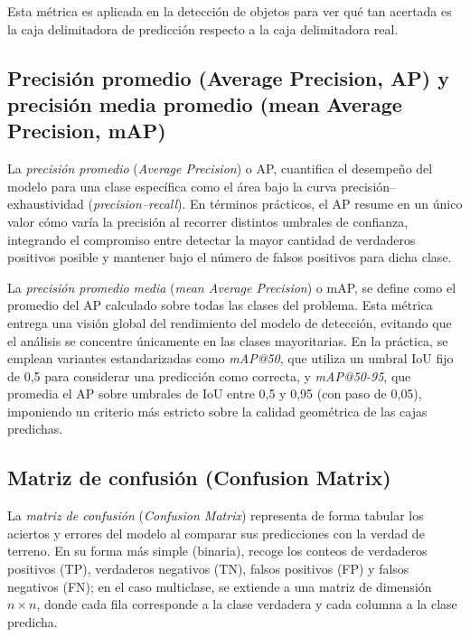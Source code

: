 \par Esta métrica es aplicada en la detección de objetos para ver qué tan acertada es la caja delimitadora de predicción respecto a la caja delimitadora real.

\subsection{Precisión promedio (Average Precision, AP) y precisión media promedio (mean Average Precision, mAP)}

\par La \textit{precisión promedio} (\textit{Average Precision}) o AP, cuantifica el desempeño del modelo para una clase específica como el área bajo la curva precisión--exhaustividad (\textit{precision--recall}). En términos prácticos, el AP resume en un único valor cómo varía la precisión al recorrer distintos umbrales de confianza, integrando el compromiso entre detectar la mayor cantidad de verdaderos positivos posible y mantener bajo el número de falsos positivos para dicha clase. \\

\par La \textit{precisión promedio media} (\textit{mean Average Precision}) o mAP, se define como el promedio del AP calculado sobre todas las clases del problema. Esta métrica entrega una visión global del rendimiento del modelo de detección, evitando que el análisis se concentre únicamente en las clases mayoritarias. En la práctica, se emplean variantes estandarizadas como \textit{mAP@50}, que utiliza un umbral IoU fijo de 0{,}5 para considerar una predicción como correcta, y \textit{mAP@50-95}, que promedia el AP sobre umbrales de IoU entre 0{,}5 y 0{,}95 (con paso de 0{,}05), imponiendo un criterio más estricto sobre la calidad geométrica de las cajas predichas. \\


\subsection{Matriz de confusión (Confusion Matrix)}

\par La \textit{matriz de confusión} (\textit{Confusion Matrix}) representa de forma tabular los aciertos y errores del modelo al comparar sus predicciones con la verdad de terreno. En su forma más simple (binaria), recoge los conteos de verdaderos positivos (TP), verdaderos negativos (TN), falsos positivos (FP) y falsos negativos (FN); en el caso multiclase, se extiende a una matriz de dimensión $n \times n$, donde cada fila corresponde a la clase verdadera y cada columna a la clase predicha. \\

